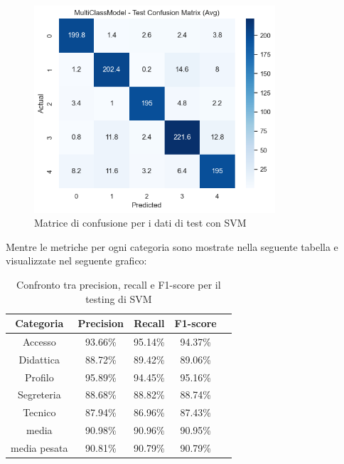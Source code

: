 \begin{figure}[H]
    \centering
    \includegraphics[width=0.8\textwidth]{images/confusion_matrix_test_svm.png}
    \caption{Matrice di confusione per i dati di test con SVM}
    \label{fig:confusion_matrix_test_svm}
\end{figure}

Mentre le metriche per ogni categoria sono mostrate nella seguente tabella e visualizzate nel seguente grafico:

\begin{table}[H]
    \centering
    \begin{tabular}{|c|c|c|c|c|}
        \hline
        \textbf{Categoria} & \textbf{Precision} & \textbf{Recall} & \textbf{F1-score} \\
        \hline
        Accesso & 93.66\% & 95.14\% & 94.37\% \\
        \hline
        Didattica & 88.72\% & 89.42\% & 89.06\% \\
        \hline
        Profilo & 95.89\% & 94.45\% & 95.16\% \\
        \hline
        Segreteria & 88.68\% & 88.82\% & 88.74\% \\
        \hline
        Tecnico & 87.94\% & 86.96\% & 87.43\% \\
        \hline
        media & 90.98\% & 90.96\% & 90.95\% \\
        \hline
        media pesata & 90.81\% & 90.79\% & 90.79\% \\
        \hline
    \end{tabular}
    \caption{Confronto tra precision, recall e F1-score per il testing di SVM}
    \label{tab:metriche_svm_test}
\end{table}

